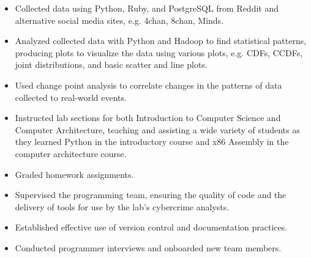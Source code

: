 \documentclass[10pt]{setzer_resume}
\begin{document}
  \begin{itemize}[nosep]%
    \item Collected data using Python, Ruby, and PostgreSQL from Reddit and alternative social media sites, e.g. 4chan, 8chan, Minds.
    \item Analyzed collected data with Python and Hadoop to find statistical patterns, producing plots to visualize the data using various plots, e.g. CDFs, CCDFs, joint distributions, and basic scatter and line plots.
    \item Used change point analysis to correlate changes in the patterns of data collected to real-world events.
  \end{itemize}


  \begin{itemize}[nosep]
    \item Instructed lab sections for both Introduction to Computer Science and Computer Architecture, teaching and assisting a wide variety of students as they learned Python in the introductory course and x86 Assembly in the computer architecture course.
    \item Graded homework assignments.
  \end{itemize}


  \begin{itemize}[nosep]
    \item Supervised the programming team, ensuring the quality of code and the delivery of tools for use by the lab's cybercrime analysts.
    \item Established effective use of version control and documentation practices.
    \item Conducted programmer interviews and onboarded new team members.
  \end{itemize}

\end{document}
